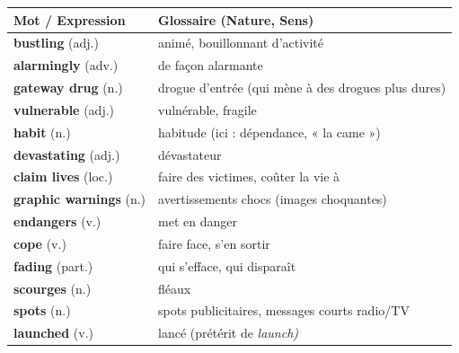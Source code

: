 \documentclass[11pt]{article}
\newcommand{\eng}[1]{\ifmmode\text{\textit{#1}}\else\begingroup\selectlanguage{english}\itshape #1\endgroup\fi}
\begin{document}
\begin{center}
\begin{tabularx}{\linewidth}{|l|X|}
\hline
\rowcolor{popblueL} \textbf{Mot / Expression} & \textbf{Glossaire (Nature, Sens)} \\
\hline
\textbf{bustling} (adj.) & animé, bouillonnant d'activité \\
\textbf{alarmingly} (adv.) & de façon alarmante \\
\textbf{gateway drug} (n.) & drogue d'entrée (qui mène à des drogues plus dures) \\
\textbf{vulnerable} (adj.) & vulnérable, fragile \\
\textbf{habit} (n.) & habitude (ici : dépendance, « la came ») \\
\textbf{devastating} (adj.) & dévastateur \\
\textbf{claim lives} (loc.) & faire des victimes, coûter la vie à \\
\textbf{graphic warnings} (n.) & avertissements chocs (images choquantes) \\
\textbf{endangers} (v.) & met en danger \\
\textbf{cope} (v.) & faire face, s'en sortir \\
\textbf{fading} (part.) & qui s'efface, qui disparaît \\
\textbf{scourges} (n.) & fléaux \\
\textbf{spots} (n.) & spots publicitaires, messages courts radio/TV \\
\textbf{launched} (v.) & lancé (prétérit de \eng{launch}) \\
\hline
\end{tabularx}
\end{center}
\end{document}
